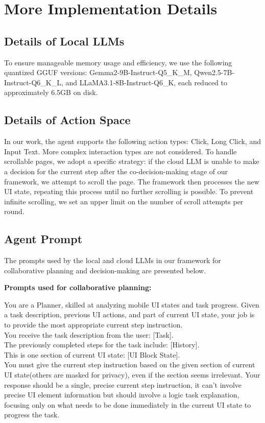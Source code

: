 \vspace{-0.3mm}
\section{More Implementation Details}
\subsection{Details of Local LLMs}
To ensure manageable memory usage and efficiency, we use the following quantized GGUF versions: Gemma2-9B-Instruct-Q5\_K\_M, Qwen2.5-7B-Instruct-Q6\_K\_L, and LLaMA3.1-8B-Instruct-Q6\_K, each reduced to approximately 6.5GB on disk. 
\subsection{Details of Action Space}
In our work, the agent supports the following action types: Click, Long Click, and Input Text. More complex interaction types are not considered. To handle scrollable pages, we adopt a specific strategy: if the cloud LLM is unable to make a decision for the current step after the co-decision-making stage of our framework, we attempt to scroll the page. The framework then processes the new UI state, repeating this process until no further scrolling is possible. To prevent infinite scrolling, we set an upper limit on the number of scroll attempts per round.
\subsection{Agent Prompt}
The prompts used by the local and cloud LLMs in our framework for collaborative planning and decision-making are presented below.

\textbf{Prompts used for collaborative planning:}
\begin{tcolorbox}[colback=orange!5!white, colframe=orange!50!black, title=Prompt for generating the sub-task candidate of each UI block (local LLM):]
You are a Planner, skilled at analyzing mobile UI states and task progress. Given a task description, previous UI actions, and part of current UI state, your job is to provide the most appropriate current step instruction.\\

You receive the task description from the user: [Task]. \\
The previously completed steps for the task include: [History]. \\
This is one section of current UI state: [UI Block State]. \\

You must give the current step instruction based on the given section of current UI state(others are masked for privacy), even if the section seems irrelevant. Your response should be a single, precise current step instruction, it can't involve precise UI element information but should involve a logic task explanation, focusing only on what needs to be done immediately in the current UI state to progress the task.
\end{tcolorbox}

